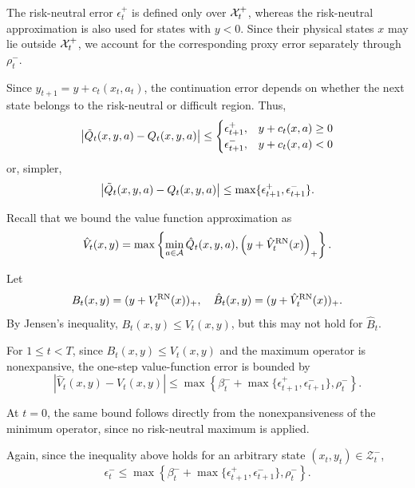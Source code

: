 The risk-neutral error $\epsilon_t^+$ is defined only over $\mathcal{X}_t^+$, whereas the risk-neutral approximation is also used for states with $y<0$. Since their physical states $x$ may lie outside $\mathcal{X}_t^+$, we account for the corresponding proxy error separately through $\rho_t^-$.

Since $y_{t+1}=y+c_t(x_t,a_t)$, the continuation error depends on whether the next state belongs to the risk-neutral or difficult region. Thus,
\begin{equation}
	\left| \tilde{Q}_t(x, y, a) - Q_t(x, y, a) \right| \leq \begin{cases}
		\epsilon_{t+1}^+, & y + c_t(x, a) \geq 0 \\
		\epsilon_{t+1}^-, & y + c_t(x, a) < 0
	\end{cases}
	\notag
\end{equation}
or, simpler,
\begin{equation}
	\left| \tilde{Q}_t(x, y, a) - Q_t(x, y, a) \right| \leq \max \{ \epsilon_{t+1}^+, \epsilon_{t+1}^- \}.
	\notag
	\label{difficult-continuation-q-error}
\end{equation}

Recall that we bound the value function approximation as
\begin{equation*}
	\hat{V}_t(x, y) = \max \left\{ \min_{a \in \mathcal{A}} \hat{Q}_t(x, y, a), \left( y + \hat{V}_t^{\text{RN}}(x) \right)_+ \right\}.
\end{equation*}

Let
\begin{equation}
	B_t(x,y)=(y+V_t^{\text{RN}}(x))_+,
	\quad
	\hat{B}_t(x,y)=(y+\hat{V}_t^{\text{RN}}(x))_+.
	\notag
	\label{rn-continuation}
\end{equation}
By Jensen's inequality, $B_t(x,y)\leq V_t(x,y)$, but this may not hold for $\hat{B}_t$. 

For $1 \leq t < T$, since $B_t(x,y)\leq V_t(x,y)$ and the maximum operator is nonexpansive, the one-step value-function error is bounded by
\begin{equation}
	\left| \hat{V}_t(x, y) - V_t(x, y) \right| \leq \max \left\{ \beta_t^- + \max \{ \epsilon_{t+1}^+, \epsilon_{t+1}^- \}, \rho_t^- \right\}.
	\label{difficult-one-step-value}
\end{equation}

At $t=0$, the same bound follows directly from the nonexpansiveness of the minimum operator, since no risk-neutral maximum is applied.

Again, since the inequality above holds for an arbitrary state $(x_t, y_t) \in \mathcal{Z}_t^-$,
\begin{equation*}
	\epsilon_t^- \leq \max \left\{ \beta_t^- + \max \{ \epsilon_{t+1}^+, \epsilon_{t+1}^- \}, \rho_t^- \right\}.
\end{equation*}

